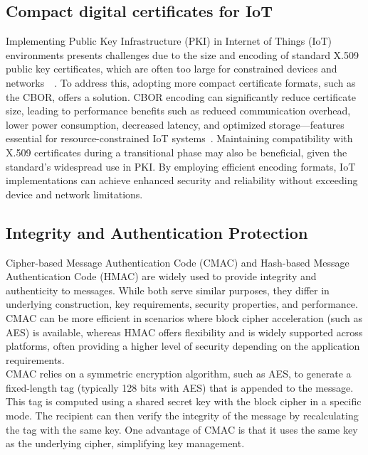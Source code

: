 \documentclass[pdflatex,sn-mathphys-num]{sn-jnl}%
\theoremstyle{thmstyleone}%
\theoremstyle{thmstyletwo}%
\theoremstyle{thmstylethree}%
\begin{document}
\subsection{Compact digital certificates for IoT}

Implementing Public Key Infrastructure (PKI) in Internet of Things (IoT) environments presents challenges due to the size and encoding of standard X.509 public key certificates, which are often too large for constrained devices and networks~~\cite{RFC7228}. To address this, adopting more compact certificate formats, such as the CBOR, offers a solution. CBOR encoding can significantly reduce certificate size, leading to performance benefits such as reduced communication overhead, lower power consumption, decreased latency, and optimized storage—features essential for resource-constrained IoT systems~\cite{RFC8949}. Maintaining compatibility with X.509 certificates during a transitional phase may also be beneficial, given the standard’s widespread use in PKI. By employing efficient encoding formats, IoT implementations can achieve enhanced security and reliability without exceeding device and network limitations.




\subsection{Integrity and Authentication Protection}



Cipher-based Message Authentication Code (CMAC) and Hash-based Message Authentication Code (HMAC) are widely used to provide integrity and authenticity to messages. While both serve similar purposes, they differ in underlying construction, key requirements, security properties, and performance. CMAC can be more efficient in scenarios where block cipher acceleration (such as AES) is available, whereas HMAC offers flexibility and is widely supported across platforms, often providing a higher level of security depending on the application requirements.\\

CMAC relies on a symmetric encryption algorithm, such as AES, to generate a fixed-length tag (typically 128 bits with AES) that is appended to the message. This tag is computed using a shared secret key with the block cipher in a specific mode. The recipient can then verify the integrity of the message by recalculating the tag with the same key. One advantage of CMAC is that it uses the same key as the underlying cipher, simplifying key management.\\
\end{document}
